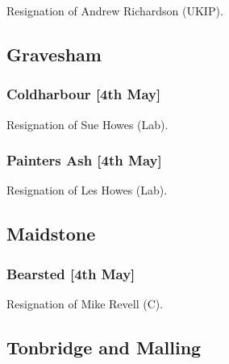 \documentclass[a4paper,openany]{book}
\begin{document}
\begin{resultsiii}

Resignation of Andrew Richardson (UKIP).

\subsection*{Gravesham}

\subsubsection*{Coldharbour \hspace*{\fill}\nolinebreak[1]%
\enspace\hspace*{\fill}
[4th May]}


Resignation of Sue Howes (Lab).

\subsubsection*{Painters Ash \hspace*{\fill}\nolinebreak[1]%
\enspace\hspace*{\fill}
[4th May]}


Resignation of Les Howes (Lab).

\subsection*{Maidstone}

\subsubsection*{Bearsted \hspace*{\fill}\nolinebreak[1]%
\enspace\hspace*{\fill}
[4th May]}


Resignation of Mike Revell (C).

\subsection*{Tonbridge and Malling}


\end{resultsiii}
\end{document}

